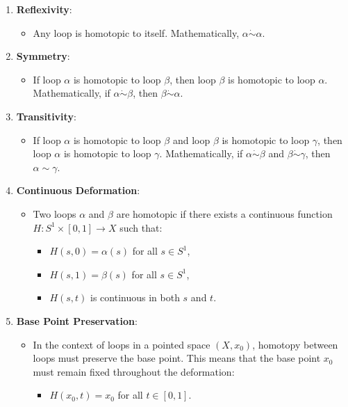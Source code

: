 \documentclass{article}
\begin{document}
\begin{theorem}

\begin{enumerate}
    \item \textbf{Reflexivity}:
    \begin{itemize}
        \item Any loop is homotopic to itself. Mathematically, \(\alpha \dot \sim \alpha\).
    \end{itemize}

    \item \textbf{Symmetry}:
    \begin{itemize}
        \item If loop \(\alpha\) is homotopic to loop \(\beta\), then loop \(\beta\) is homotopic to loop \(\alpha\). Mathematically, if \(\alpha \dot \sim \beta\), then \(\beta \dot \sim \alpha\).
    \end{itemize}

    \item \textbf{Transitivity}:
    \begin{itemize}
        \item If loop \(\alpha\) is homotopic to loop \(\beta\) and loop \(\beta\) is homotopic to loop \(\gamma\), then loop \(\alpha\) is homotopic to loop \(\gamma\). Mathematically, if \(\alpha \dot \sim \beta\) and \(\beta \dot \sim \gamma\), then \(\alpha \sim \gamma\).
    \end{itemize}

    \item \textbf{Continuous Deformation}:
    \begin{itemize}
        \item Two loops \(\alpha\) and \(\beta\) are homotopic if there exists a continuous function \(H: S^1 \times [0, 1] \to X\) such that:
        \begin{itemize}
            \item \(H(s, 0) = \alpha(s)\) for all \(s \in S^1\),
            \item \(H(s, 1) = \beta(s)\) for all \(s \in S^1\),
            \item \(H(s, t)\) is continuous in both \(s\) and \(t\).
        \end{itemize}
    \end{itemize}

    \item \textbf{Base Point Preservation}:
    \begin{itemize}
        \item In the context of loops in a pointed space \((X, x_0)\), homotopy between loops must preserve the base point. This means that the base point \(x_0\) must remain fixed throughout the deformation:
        \begin{itemize}
            \item \(H(x_0, t) = x_0\) for all \(t \in [0, 1]\).
        \end{itemize}
    \end{itemize}

\end{enumerate}
    
\end{theorem}
\end{document}
